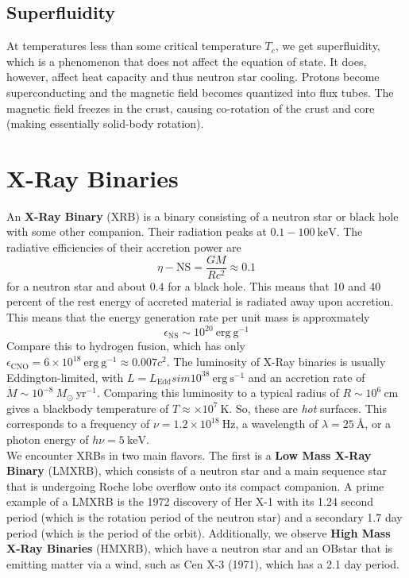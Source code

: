 \documentclass[10pt]{article}
\numberwithin{equation}{section}
\newcommand{\n}{\noindent}
\begin{document}
	\subsection{Superfluidity} %
	\label{sub:superfluidity}
	At temperatures less than some critical temperature $T_c$, we get superfluidity, which is a phenomenon that does not affect the equation of state. It does, however, affect heat capacity and thus neutron star cooling. Protons become superconducting and the magnetic field becomes quantized into flux tubes. The magnetic field freezes in the crust, causing co-rotation of the crust and core (making essentially solid-body rotation).
\section{X-Ray Binaries} %
\label{sec:x_ray_binaries}
	An \textbf{X-Ray Binary} (XRB) is a binary consisting of a neutron star or black hole with some other companion. Their radiation peaks at $0.1-100\ \mathrm{keV}$. The radiative efficiencies of their accretion power are
	\begin{equation}
		\label{eq:x_ray_binary:1} \eta-{\mathrm{NS}} = \frac{GM}{Rc^2} \approx 0.1
	\end{equation}
	for a neutron star and about $0.4$ for a black hole. This means that 10 and 40 percent of the rest energy of accreted material is radiated away upon accretion. This means that the energy generation rate per unit mass is approxmately
	\begin{equation}
		\label{eq:x_ray_binary:2} \epsilon_{\mathrm{NS}}\sim 10^{20}\ \mathrm{erg\ g^{-1}}
	\end{equation}
	Compare this to hydrogen fusion, which has only $\epsilon_{\mathrm{CNO}}=6\times 10^{18}\ \mathrm{erg\ g^{-1}}\approx 0.007c^2$. The luminosity of X-Ray binaries is usually Eddington-limited, with $L=L_{\mathrm{Edd}}sim 10^{38}\ \mathrm{erg\ s^{-1}}$ and an accretion rate of $\dot{M}\sim 10^{-8}\ M_\odot\ \mathrm{yr^{-1}}$. Comparing this luminosity to a typical radius of $R\sim 10^6\ \mathrm{cm}$ gives a blackbody temperature of $T\approx \times 10^{7}\ \mathrm{K}$. So, these are \emph{hot} surfaces. This corresponds to a frequency of $\nu=1.2\times 10^{18}\ \mathrm{Hz}$, a wavelength of $\lambda = 25\ \textrm{\AA}$, or a photon energy of $h\nu = 5\ \mathrm{keV}$.\\
	
	\n We encounter XRBs in two main flavors. The first is a \textbf{Low Mass X-Ray Binary} (LMXRB), which consists of a neutron star and a main sequence star that is undergoing Roche lobe overflow onto its compact companion. A prime example of a LMXRB is the 1972 discovery of Her X-1 with its 1.24 second period (which is the rotation period of the neutron star) and a secondary 1.7 day period (which is the period of the orbit). Additionally, we observe \textbf{High Mass X-Ray Binaries} (HMXRB), which have a neutron star and an OBstar that is emitting matter via a wind, such as Cen X-3 (1971), which has a 2.1 day period.\\
	
\end{document}
